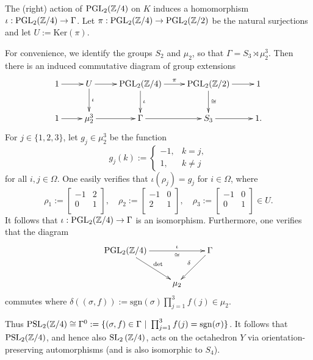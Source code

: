 \documentclass[12pt]{amsart}
\theoremstyle{definition}
\newcommand{\Z}{\Bbb{Z}}
\newcommand{\spl}[2]{\operatorname{SL}_{#1}\left(#2\right)}
\newcommand{\pspl}[2]{\mathrm{PSL}_{#1}(#2)}
\newcommand{\pgl}[2]{\mathrm{PGL}_{#1}(#2)}
\newcommand{\<}{\langle}
\renewcommand{\>}{\rangle}
\renewcommand{\ker}[1]{\mathrm{Ker}(#1)}
\begin{document}
 The (right) action of $\pgl{2}{\Z/4}$ on $K$ induces a homomorphism $\iota: \pgl{2}{\Z/4}\to\Gamma$. Let $\pi:\pgl{2}{\Z/4}\to\pgl{2}{\Z/2}$ be the natural surjections and let $U:=\ker{\pi}$. 

For convenience, we identify the groups $S_2$ and $\mu_2$, so that $\Gamma=S_3\rtimes \mu_2^3$. Then there is an induced commutative diagram of group extensions
\[
\xymatrix{
1\ar[r]&U\ar[r]\ar^-{\iota}[d]&\pgl{2}{\Z/4}\ar^-{\pi}[r]\ar^-{\iota}[d]&\pgl{2}{\Z/2}\ar[r]\ar^-{\cong}[d]&1\\
1\ar[r]&\mu_2^3\ar[r]&\Gamma\ar[r]&S_3\ar[r]&1.\\
}
\]
For $j\in \{ 1,2,3\}$, let $g_j\in \mu_2^3$ be the function
\[
g_j(k):=
\left\{
\begin{array}{ll}
-1,& k=j,\\
1,&k\not=j
\end{array}
\right.
\]
for all $i,j\in \Omega$. One easily verifies that $\iota(\rho_j)=g_j$ for $i\in \Omega$, where 
\[
\rho_1:=
\left[
\begin{array}{cc}
-1&2\\
0&1\\
\end{array}
\right],\quad
\rho_2:=
\left[
\begin{array}{cc}
-1&0\\
2&1\\
\end{array}
\right]
,\quad
\rho_3:=
\left[
\begin{array}{cc}
-1&0\\
0&1\\
\end{array}
\right]
\in U.
\]
It follows that $\iota:\pgl{2}{\Z/4}\to\Gamma$ is an isomorphism. Furthermore, one verifies that the diagram 
\[
\xymatrix{
\pgl{2}{\Z/4}\ar^-{\mathrm{det}}[rd]\ar^-{\iota}_-{\cong}[rr]&&\Gamma\ar_-{\delta}[ld]\\
&\mu_2&\\
}
\]
commutes where $\delta((\sigma,f)):=\mathrm{sgn}(\sigma)\prod_{j=1}^3f(j)\in \mu_2$. 

Thus $\pspl{2}{\Z/4}\cong \Gamma^0:= \{ (\sigma,f)\in \Gamma\ |\ \prod_{j=1}^3f(j)=\mathrm{sgn}(\sigma)\}$.
It follows that $\pspl{2}{\Z/4}$, and hence also $\spl{2}{\Z/4}$,  acts on the octahedron $Y$ via orientation-preserving automorphisms (and is also isomorphic to $S_4$).

\end{document}
